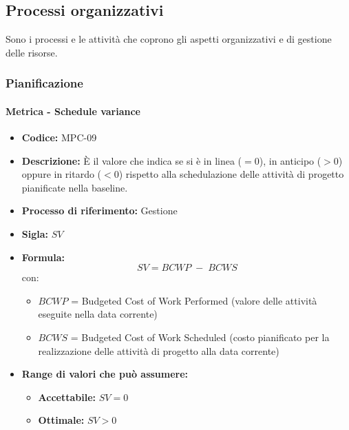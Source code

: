 \subsection{Processi organizzativi}
Sono i processi e le attività che coprono gli aspetti organizzativi e di gestione delle risorse.

\subsubsection{Pianificazione}
    \paragraph{Metrica - Schedule variance}
    \begin{itemize}
        \item \textbf{Codice:} MPC-09
        \item \textbf{Descrizione:} È il valore che indica se si è in linea ($=0$), in anticipo ($>0$) oppure in ritardo ($<0$) rispetto alla schedulazione delle attività di progetto pianificate nella baseline.
        \item \textbf{Processo di riferimento:} Gestione
        \item \textbf{Sigla:} $SV$
        \item \textbf{Formula:} $$SV = {BCWP \; - \; BCWS}$$
        con:
        \begin{itemize}
            \item $BCWP$ = Budgeted Cost of Work Performed (valore delle attività eseguite nella data corrente)
            \item $BCWS$ = Budgeted Cost of Work Scheduled (costo pianificato per la realizzazione delle attività di progetto alla data corrente)
        \end{itemize}
        \item \textbf{Range di valori che può assumere:}
        \begin{itemize}
            \item \textbf{Accettabile:} $SV = 0$
            \item \textbf{Ottimale:} $SV > 0$
        \end{itemize}
    \end{itemize}

